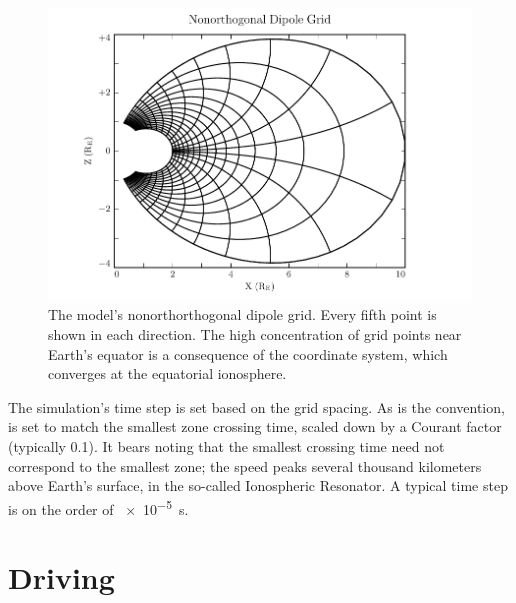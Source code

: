\begin{figure}[!htb]
    \centering
    \includegraphics[width=\textwidth]{figures/grid.pdf}
    \caption[Nonorthogonal Dipole Grid]{
      The model's nonorthorthogonal dipole grid. Every fifth point is shown in each direction. The high concentration of grid points near Earth's equator is a consequence of the coordinate system, which converges at the equatorial ionosphere. 
    }
    \label{fig_grid}
\end{figure}

The simulation's time step is set based on the grid spacing. As is the convention, \dt is set to match the smallest \Alfven zone crossing time, scaled down by a Courant factor (typically 0.1). It bears noting that the smallest crossing time need not correspond to the smallest zone; the \Alfven speed peaks several thousand kilometers above Earth's surface, in the so-called Ionospheric \Alfven Resonator\cite{lysak_2013}. A typical time step is on the order of \SI{e-5}{\second}. 

\section{Driving}
  \label{sec_driving}


